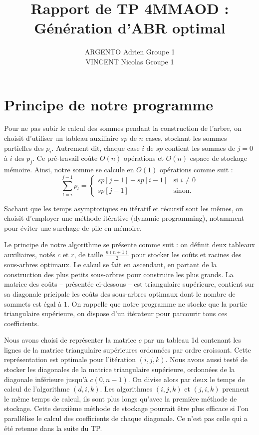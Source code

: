 \documentclass[a4paper, 10pt, french]{article}
\title{Rapport de TP 4MMAOD : Génération d'ABR optimal}
\author{
ARGENTO Adrien Groupe 1 
\\ VINCENT Nicolas Groupe 1 
}
\begin{document}
\maketitle

\section{Principe de notre  programme}
Pour ne pas subir le calcul des sommes pendant la construction de l'arbre, on choisit d'utiliser un tableau auxiliaire $sp$ de $n$ cases, stockant les sommes partielles des $p_i$. Autrement dit, chaque case $i$ de $sp$ contient les sommes de $j = 0$ à $i$ des $p_j$. Ce pré-travail coûte $O(n)$ opérations et $O(n)$ espace de stockage mémoire. Ainsi, notre somme se calcule en $O(1)$ opérations	 comme suit : $$\sum \limits_{l = i}^{j - 1} p_l =
  \left\{
  \begin{array}{ll}
    sp[j - 1] - sp[i - 1] & \mbox{si } i \neq 0 \\
    sp[j - 1]             & \mbox{sinon.}
  \end{array}
  \right.$$

Sachant que les temps asymptotiques en itératif et récursif sont les mêmes, on choisit d'employer une méthode itérative (dynamic-programming), notamment pour éviter une surchage de pile en mémoire. \par\leavevmode\par

Le principe de notre algorithme se présente comme suit : on définit deux tableaux auxiliaires, notés $c$ et $r$, de taille $\frac{n(n+1)}{2}$ pour stocker les coûts et racines des sous-arbres optimaux. Le calcul se fait en ascendant, en partant de la construction des plus petits sous-arbres pour construire les plus grands. La matrice des coûts -- présentée ci-dessous -- est triangulaire supérieure, contient sur sa diagonale pricipale les coûts des sous-arbres optimaux dont le nombre de sommets est égal à $1$. On rappelle que notre programme ne stocke que la partie triangulaire supérieure, on dispose d'un itérateur pour parcourir tous ces coefficients. 

Nous avons choisi de représenter la matrice $c$ par un tableau 1d contenant les lignes de la matrice triangulaire supérieures ordonnées par ordre croissant. Cette représentation est optimale pour l'itération $(i, j, k)$. Nous avons aussi testé de stocker les diagonales de la matrice triangulaire supérieure, ordonnées de la diagonale inférieure jusqu'à $c(0, n - 1)$. On divise alors par deux le temps de calcul de l'algorithme $(d, i, k)$. Les algorithmes $(i, j, k)$ et $(j, i, k)$ prennent le même temps de calcul, ils sont plus longs qu'avec la première méthode de stockage. Cette deuxième méthode de stockage pourrait être plus efficace si l'on parallélise le calcul des coefficients de chaque diagonale. Ce n'est pas celle qui a été retenue dans la suite du TP.
\end{document}
